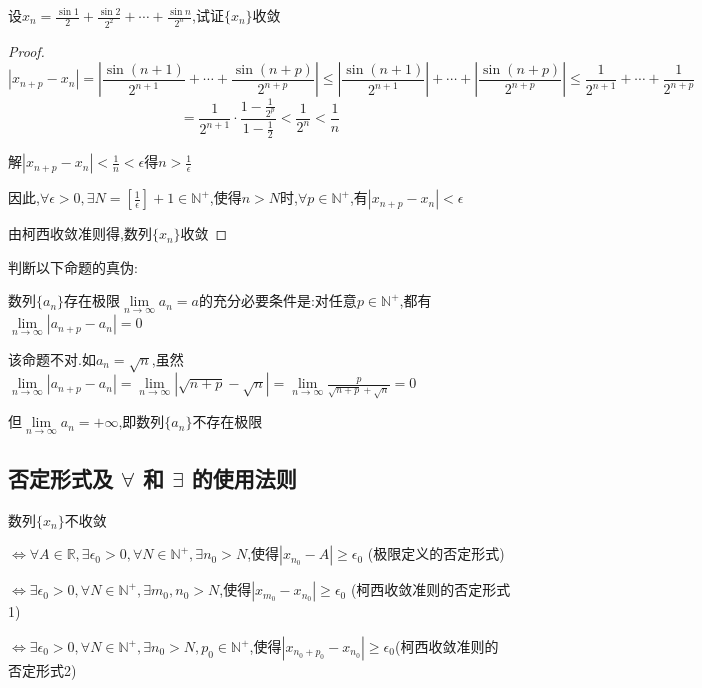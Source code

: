 \begin{example}
    设$\displaystyle x_n=\frac{\sin 1}{2}+\frac{\sin 2}{2^2}+\cdots+\frac{\sin n}{2^n}$,试证$\{x_n\}$收敛
\end{example}

\begin{proof}
    $$|x_{n+p}-x_n|
    =|\frac{\sin (n+1)}{2^{n+1}}+\cdots+\frac{\sin (n+p)}{2^{n+p}}|
    \le |\frac{\sin (n+1)}{2^{n+1}}|+\cdots+|\frac{\sin (n+p)}{2^{n+p}}|
    \le \frac{1}{2^{n+1}}+\cdots+\frac{1}{2^{n+p}}$$
    $$=\frac{1}{2^{n+1}} \cdot \frac{1-\frac{1}{2^p}}{1-\frac{1}{2}}
    <\frac{1}{2^n}<\frac{1}{n}$$

    解$|x_{n+p}-x_n|<\frac{1}{n}<\epsilon$得$n>\frac{1}{\epsilon}$

    因此,$\forall \epsilon>0,\exists N=[\frac{1}{\epsilon}]+1\in \mathbb{N}^+$,使得$n>N$时,$\forall p\in \mathbb{N}^+$,有$|x_{n+p}-x_n|<\epsilon$

    由柯西收敛准则得,数列$\{x_n\}$收敛 
\end{proof}

\clearpage
\begin{example}
    判断以下命题的真伪:

    数列$\{a_n\}$存在极限$\lim \limits_{n \to \infty} a_n =a$的充分必要条件是:对任意$p\in \mathbb{N}^+$,都有$\lim \limits_{n \to \infty}|a_{n+p}-a_n|=0$
\end{example}

\begin{solution}
    
    该命题不对.如$a_n=\sqrt{n}$,虽然$\lim \limits_{n \to \infty}|a_{n+p}-a_n|
    =\lim \limits_{n \to \infty}|\sqrt{n+p}-\sqrt{n}|
    =\lim \limits_{n \to \infty} \frac{p}{\sqrt{n+p}+\sqrt{n}}
    =0$

    但$\lim \limits_{n \to \infty} a_n =+\infty$,即数列$\{a_n\}$不存在极限
\end{solution}

\subsection{否定形式及 \texorpdfstring{$\forall$}{} 和 \texorpdfstring{$\exists$}{} 的使用法则}

\begin{theorem}[数列不收敛]
    数列$\{x_n\}$不收敛

    $\Longleftrightarrow \forall A \in \mathbb{R}, \exists \epsilon_0 > 0,\forall N\in \mathbb{N}^+,\exists n_0 > N$,使得$|x_{n_0}-A|\ge \epsilon_0$ \qquad (极限定义的否定形式)
    
    $\Longleftrightarrow \exists \epsilon_0 > 0,\forall N\in \mathbb{N}^+,\exists m_0,n_0 > N$,使得$|x_{m_0}-x_{n_0}|\ge \epsilon_0 $ \qquad (柯西收敛准则的否定形式1)

    $\Longleftrightarrow \exists \epsilon_0 > 0,\forall N\in \mathbb{N}^+,\exists n_0>N,p_0\in \mathbb{N}^+$,使得$|x_{n_0+p_0}-x_{n_0}|\ge \epsilon_0 $\qquad (柯西收敛准则的否定形式2)
\end{theorem}

